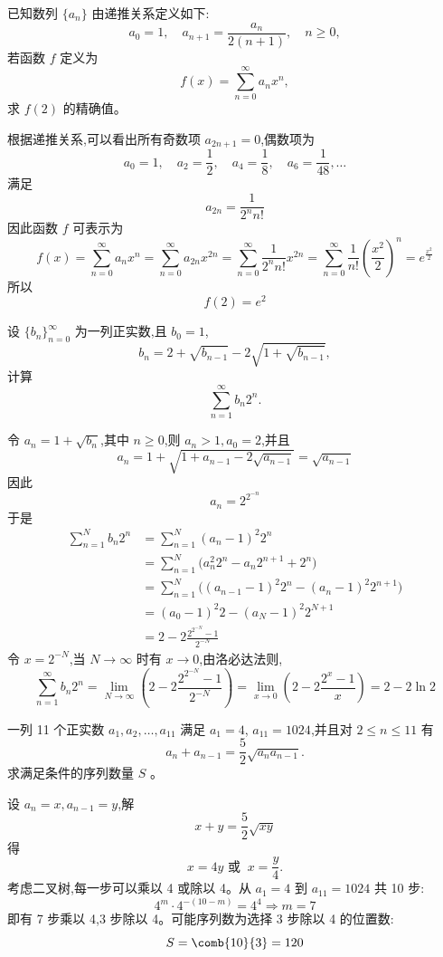 \begin{questions}
    \question 已知数列 $\{a_n\}$ 由递推关系定义如下:
    \[
    a_0 = 1, \quad a_{n+1} = \frac{a_n}{2(n+1)}, \quad n \ge 0,
    \]
    若函数 $f$ 定义为
    \[
    f(x) = \sum_{n=0}^{\infty} a_n x^n,
    \]
    求 $f(2)$ 的精确值。
    \begin{solution}
        根据递推关系,可以看出所有奇数项 $a_{2n+1} = 0$,偶数项为
        \[
        a_0 = 1, \quad a_2 = \frac{1}{2}, \quad a_4 = \frac{1}{8}, \quad a_6 = \frac{1}{48}, \dots
        \]
        满足
        \[
        a_{2n} = \frac{1}{2^n n!}
        \]
        因此函数 $f$ 可表示为
        \[
        f(x) = \sum_{n=0}^{\infty} a_n x^n = \sum_{n=0}^{\infty} a_{2n} x^{2n} = \sum_{n=0}^{\infty} \frac{1}{2^n n!} x^{2n} = \sum_{n=0}^{\infty} \frac{1}{n!} \left(\frac{x^2}{2}\right)^n = e^\frac{x^2}{2}
        \]
        所以
        \[
        f(2) = e^2
        \]
    \end{solution}

    \question 设 $\{b_n\}_{n=0}^\infty$ 为一列正实数,且 $b_0=1$,
    \[
    b_n=2+\sqrt{b_{n-1}}-2\sqrt{1+\sqrt{b_{n-1}}},
    \]
    计算
    \[
    \sum_{n=1}^\infty b_n 2^n.
    \]
    \begin{solution}
        令 $a_n=1+\sqrt{b_n}$,其中 $n\ge0$,则 $a_n>1,a_0=2$,并且
        \[
        a_n=1+\sqrt{1+a_{n-1}-2\sqrt{a_{n-1}}}=\sqrt{a_{n-1}}
        \]
        因此
        \[
        a_n=2^{2^{-n}}
        \]
        于是
        \begin{align*}
        \sum_{n=1}^N b_n 2^n
        &=\sum_{n=1}^N (a_n-1)^2 2^n \\
        &=\sum_{n=1}^N \bigl(a_n^2 2^n-a_n 2^{n+1}+2^n\bigr) \\
        &=\sum_{n=1}^N \bigl((a_{n-1}-1)^2 2^n-(a_n-1)^2 2^{n+1}\bigr) \\
        &=(a_0-1)^2 2-(a_N-1)^2 2^{N+1} \\
        &=2-2\frac{2^{2^{-N}}-1}{2^{-N}}
        \end{align*}
        令 $x=2^{-N}$,当 $N\to\infty$ 时有 $x\to0$,由洛必达法则,
        \[
        \sum_{n=1}^\infty b_n 2^n
        =\lim_{N\to\infty}\left(2-2\frac{2^{2^{-N}}-1}{2^{-N}}\right)
        =\lim_{x\to0}\left(2-2\frac{2^x-1}{x}\right)
        =2-2\ln2
        \]
    \end{solution}
    
    \question 一列 11 个正实数 $a_1, a_2, \dots, a_{11}$ 满足 $a_1 = 4$, $a_{11} = 1024$,并且对 $2 \le n \le 11$ 有
    \[
    a_n + a_{n-1} = \frac{5}{2} \sqrt{a_n a_{n-1}}.
    \]
    求满足条件的序列数量 $S$ 。
    \begin{solution}
        设 $a_n = x,a_{n-1} = y$,解
        \[
        x+y = \frac{5}{2}\sqrt{xy}
        \]
        得
        \[
        x = 4y \text{ 或 } \ x = \frac{y}{4}.
        \]
        考虑二叉树,每一步可以乘以 4 或除以 4。从 $a_1=4$ 到 $a_{11}=1024$ 共 10 步:
        \[
        4^m \cdot 4^{-(10-m)} = 4^4 \Rightarrow m =7
        \]
        即有 7 步乘以 4,3 步除以 4。可能序列数为选择 3 步除以 4 的位置数:
        \[
        S = \comb{10}{3} = 120
        \]
    \end{solution}


\end{questions}
